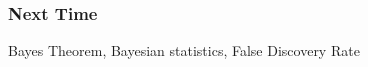 \documentclass[slides]{beamer}
\begin{document}
\begin{frame}[fragile]
\frametitle{Next Time}

Bayes Theorem, Bayesian statistics, False Discovery Rate

\end{frame}
\end{document}
